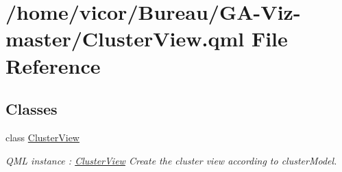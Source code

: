 \hypertarget{_cluster_view_8qml}{}\section{/home/vicor/\+Bureau/\+G\+A-\/\+Viz-\/master/\+Cluster\+View.qml File Reference}
\label{_cluster_view_8qml}
\subsection*{Classes}
\begin{DoxyCompactItemize}
\item 
class \hyperlink{class_cluster_view}{Cluster\+View}
\begin{DoxyCompactList}\small\item\em Q\+ML instance \+: \hyperlink{class_cluster_view}{Cluster\+View} Create the cluster view according to cluster\+Model. \end{DoxyCompactList}\end{DoxyCompactItemize}
